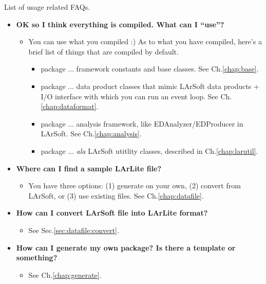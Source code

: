 List of usage related FAQs.

\begin{itemize}

\item[] {\bf OK so I think everything is compiled. What can I ``use''?}
  \begin{itemize}
    \item You can use what you compiled :) As to what you have compiled,
      here's a brief list of things that are compiled by default.
      \begin{itemize}
        \item \Base package ... framework constants and base classes. See Ch.\ref{chap:base}.
        \item \DataFormat package ... data product classes that mimic LArSoft data products + I/O interface with which you can run an event loop. See Ch.\ref{chap:dataformat}.
        \item \Analysis package ... analysis framework, like EDAnalyzer/EDProducer in LArSoft. See Ch.\ref{chap:analysis}.
        \item \LArUtil package ... {\it ala} LArSoft utitlity classes, described in Ch.\ref{chap:larutil}.
      \end{itemize}
  \end{itemize}

\item[] {\bf Where can I find a sample LArLite \ROOT file?}
  \begin{itemize}
    \item You have three options: (1) generate on your own, (2) convert from LArSoft, or (3) use existing files. See Ch.\ref{chap:datafile}.
  \end{itemize}

\item[] {\bf How can I convert LArSoft file into LArLite format?}
  \begin{itemize}
    \item See Sec.\ref{sec:datafile:convert}.
  \end{itemize}

\item[] {\bf How can I generate my own package? Is there a template or something?}
  \begin{itemize}
    \item See Ch.\ref{chap:generate}.
  \end{itemize}


\end{itemize}
